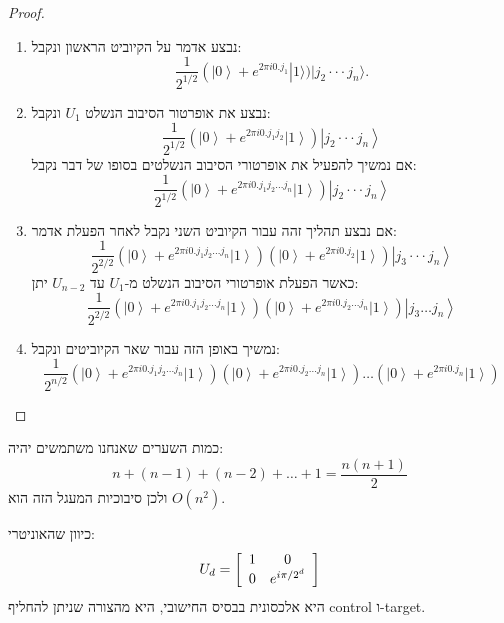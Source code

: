 \documentclass{tstextbook}
\begin{document}
\begin{proof}
  \begin{enumerate}
    \item נבצע אדמר על הקיוביט הראשון ונקבל: 
$$\frac{1}{2^{1/2}}\left(\left|0\right\rangle+e^{2\pi i0.j_{1}}\right|1\rangle)|j_{2}\cdot\cdot\cdot j_{n}\rangle.$$


    \item נבצע את אופרטור הסיבוב הנשלט \(U_{1}\) ונקבל: 
$$\frac{1}{2^{1/2}}\left(\left|0\right\rangle+e^{2\pi i0.j_{1}j_{2}}\left|1\right\rangle\right)\left|j_{2}\cdot\cdot\cdot j_{n}\right\rangle$$
אם נמשיך להפעיל את אופרטורי הסיבוב הנשלטים בסופו של דבר נקבל:
$$\frac{1}{2^{1/2}}\left(\left|0\right\rangle+e^{2\pi i0.j_{1}j_{2}\dots j_{n}}\left|1\right\rangle\right)\left|j_{2}\cdot\cdot\cdot j_{n}\right\rangle$$


    \item אם נבצע תהליך זהה עבור הקיוביט השני נקבל לאחר הפעלת אדמר: 
$${\frac{1}{2^{2/2}}}\left(\left|0\right\rangle+e^{2\pi i0.j_{1}j_{2}\ldots j_{n}}\left|1\right\rangle\right)\left(\left|0\right\rangle+e^{2\pi i0.j_{2}}\left|1\right\rangle\right)\left|j_{3}\cdot\cdot\cdot j_{n}\right\rangle$$
כאשר הפעלת אופרטורי הסיבוב הנשלט מ-\(U_{1}\) עד \(U_{n-2}\) יתן:
$${\frac{1}{2^{2/2}}}\left(\left|0\right\rangle+e^{2\pi i0.j_{1}j_{2}\ldots j_{n}}\left|1\right\rangle\right)\left(\left|0\right\rangle+e^{2\pi i0.j_{2}\ldots j_{n}}\left|1\right\rangle\right)\left|j_{3}\ldots j_{n}\right\rangle$$


    \item נמשיך באופן הזה עבור שאר הקיוביטים ונקבל: 
$${\frac{1}{2^{n/2}}}\left(\left|0\right\rangle+e^{2\pi i0.j_{1}j_{2}\ldots j_{n}}\left|1\right\rangle\right)\left(\left|0\right\rangle+e^{2\pi i0.j_{2}\ldots j_{n}}\left|1\right\rangle\right)\ldots\left(\left|0\right\rangle+e^{2\pi i0.j_{n}}\left|1\right\rangle\right)$$


  \end{enumerate}
\end{proof}
\begin{corollary}
כמות השערים שאנחנו משתמשים יהיה:
$$n+(n-1)+(n-2)+\dots+1= \frac{n(n+1)}{2}$$
ולכן סיבוכיות המעגל הזה הוא \(O(n^{2})\).

\end{corollary}
\begin{proposition}
כיוון שהאוניטרי:
$$U_{d}=\left[\begin{array}{c c}{{1}}&{{0}}\\ {{0}}&{{e^{i\pi/2^{d}}}}\end{array}\right]$$
היא אלכסונית בבסיס החישובי, היא מהצורה שניתן להחליף control ו-target.

\end{proposition}
\end{document}
